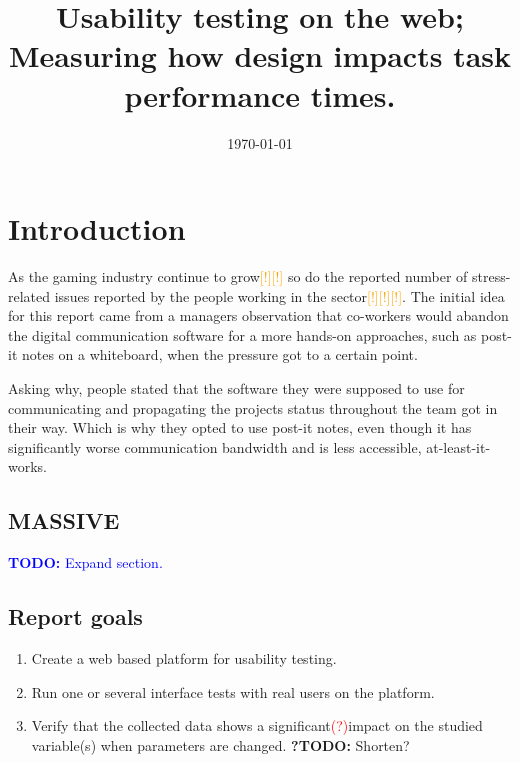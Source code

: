 \documentclass[nofilelist,dvipsnames]{cslthse-msc}
\title{
  Usability testing on the web; Measuring how design impacts task performance
  times.
}
\date{\today}
\begin{document}
\renewcommand{\bibname}{References}

\newcommand{\todo}[1]{\textcolor{blue}{\textbf{TODO:} #1}}
\newcommand{\todoMaybe}[1]{\textcolor{OliveGreen}{\textbf{?TODO:} #1?}}
\newcommand{\eatdot}[1]{}
\newcommand{\ctitle}[1]{\citetitle{#1}\cite{#1}}
\newcommand{\varHere}[1]{\unskip}
\newcommand{\checkTruth}[0]{\textcolor{red}{(?)}}%
\newcommand{\findref}[0]{\textcolor{orange}{[!]}}%
\newcommand{\todoInsert}[1]{\textcolor{purple}{\textit{<insert #1 here>}}}%
\newcommand{\numRuns}[1]{\texttt{\#r=#1}}%


\tableofcontents

\chapter{Introduction}

  As the gaming industry continue to grow{\findref\findref} so do the reported
  number of stress-related issues reported by the people working in the
  sector{\findref\findref\findref}. The initial idea for this report came from a managers
  observation that co-workers would abandon the digital communication software
  for a more hands-on approaches, such as post-it notes on a whiteboard, when
  the pressure got to a certain point.

  Asking why, people stated that the software they were supposed to use for
  communicating and propagating the projects status throughout the team got in
  their way. Which is why they opted to use post-it notes, even though it has
  significantly worse communication bandwidth and is less accessible,
  at-least-it-works\texttrademark.

  \section[MASSIVE Entertainment | A Ubisoft studio]{MASSIVE}

  {}

    \todo{Expand section.}

	\section{Report goals}

		\begin{enumerate}
			\item{Create a web based platform for usability testing.}
			\item{Run one or several interface tests with real users on the platform.}
			\item{
				Verify that the collected data shows a significant\checkTruth impact on the studied
				variable(s) when parameters are changed. \todoMaybe{Shorten}
			}
		\end{enumerate}
\end{document}

